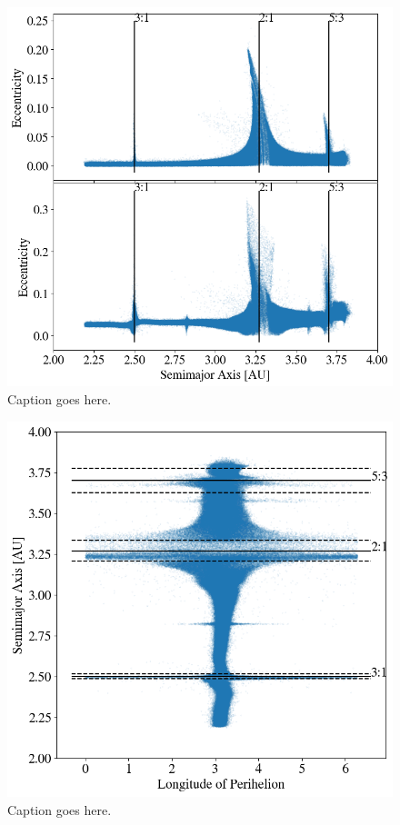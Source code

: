 \documentclass[twocolumn]{aastex63}
\begin{document}
\begin{figure}
    \includegraphics[width=\columnwidth]{figures/ae.png}
    \caption{Caption goes here.\label{fig:ae}}
\end{figure}

\begin{figure}
    \includegraphics[width=\columnwidth]{figures/long_ph.png}
    \caption{Caption goes here.\label{fig:long_ph}}
\end{figure}
\end{document}
